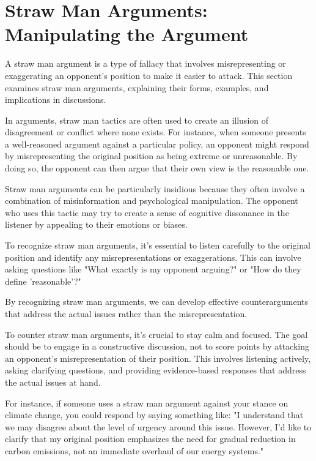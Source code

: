 \section{Straw Man Arguments: Manipulating the Argument}

A straw man argument is a type of fallacy that involves misrepresenting or exaggerating an opponent's position to make it easier to attack. This section examines straw man arguments, explaining their forms, examples, and implications in discussions.

In arguments, straw man tactics are often used to create an illusion of disagreement or conflict where none exists. For instance, when someone presents a well-reasoned argument against a particular policy, an opponent might respond by misrepresenting the original position as being extreme or unreasonable. By doing so, the opponent can then argue that their own view is the reasonable one.

Straw man arguments can be particularly insidious because they often involve a combination of misinformation and psychological manipulation. The opponent who uses this tactic may try to create a sense of cognitive dissonance in the listener by appealing to their emotions or biases.

To recognize straw man arguments, it's essential to listen carefully to the original position and identify any misrepresentations or exaggerations. This can involve asking questions like "What exactly is my opponent arguing?" or "How do they define 'reasonable'?"

By recognizing straw man arguments, we can develop effective counterarguments that address the actual issues rather than the misrepresentation.

To counter straw man arguments, it's crucial to stay calm and focused. The goal should be to engage in a constructive discussion, not to score points by attacking an opponent's misrepresentation of their position. This involves listening actively, asking clarifying questions, and providing evidence-based responses that address the actual issues at hand.

For instance, if someone uses a straw man argument against your stance on climate change, you could respond by saying something like: "I understand that we may disagree about the level of urgency around this issue. However, I'd like to clarify that my original position emphasizes the need for gradual reduction in carbon emissions, not an immediate overhaul of our energy systems."

